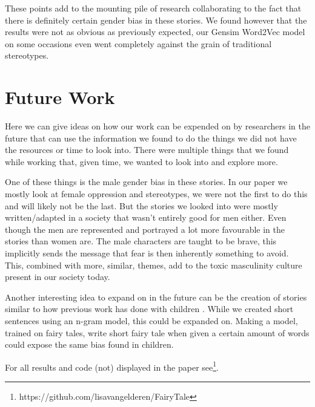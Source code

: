 \documentclass[11pt]{article}
\begin{document}
These points add to the mounting pile of research collaborating to the fact that there is definitely certain gender bias in these stories. We found however that the results were not as obvious as previously expected, our Gensim Word2Vec model on some occasions even went completely against the grain of traditional stereotypes. 



\section{Future Work}

Here we can give ideas on how our work can be expended on by researchers in the future that can use the information we found to do the things we did not have the resources or time to look into. There were multiple things that we found while working that, given time, we wanted to look into and explore more. 

One of these things is the male gender bias in these stories. In our paper we mostly look at female oppression and stereotypes, we were not the first to do this and will likely not be the last. But the stories we looked into were mostly written/adapted in a society that wasn't entirely good for men either. Even though the men are represented and portrayed a lot more favourable in the stories than women are. The male characters are taught to be brave, this implicitly sends the message that fear is then inherently something to avoid. This, combined with more, similar, themes, add to the toxic masculinity culture present in our society today. 

Another interesting idea to expand on in the future can be the creation of stories similar to how previous work has done with children \cite{Wardetzky}. While we created short sentences using an n-gram model, this could be expanded on. Making a model, trained on fairy tales, write short fairy tale when given a certain amount of words could expose the same bias found in children. 

For all results and code (not) displayed in the paper see\footnote{https://github.com/lisavangelderen/FairyTale}.
\end{document}
